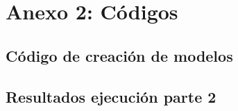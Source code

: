 \documentclass{article}
\begin{document}
\newpage
\section{Anexo 2: Códigos}

\subsection{Código de creación de modelos}




\newpage
\subsection{Resultados ejecución parte 2}
\end{document}
